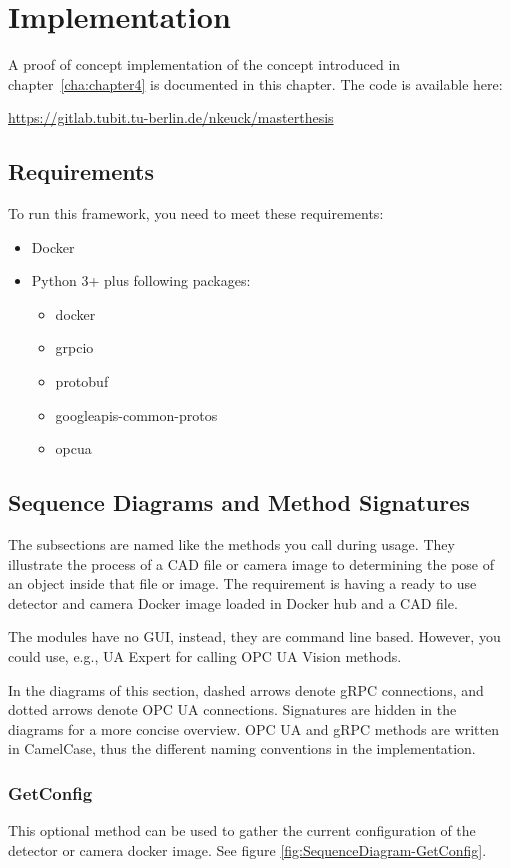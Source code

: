 \chapter{Implementation\label{cha:chapter5}}
A proof of concept implementation of the concept introduced in chapter~\ref{cha:chapter4} is documented in this chapter. The code is available here: 

\url{https://gitlab.tubit.tu-berlin.de/nkeuck/masterthesis}

\section{Requirements}
To run this framework, you need to meet these requirements:
\begin{itemize}
    \item Docker
    \item Python 3+ plus following packages:
    \begin{itemize}
        \item docker
        \item grpcio
        \item protobuf
        \item googleapis-common-protos
        \item opcua
    \end{itemize}
\end{itemize}

\section{Sequence Diagrams and Method Signatures}
The subsections are named like the methods you call during usage. They illustrate the process of a CAD file or camera image to determining the pose of an object inside that file or image. The requirement is having a ready to use detector and camera Docker image loaded in Docker hub and a CAD file. 

The modules have no GUI, instead, they are command line based. However, you could use, e.g., UA Expert for calling OPC UA Vision methods.

In the diagrams of this section, dashed arrows denote gRPC connections, and dotted arrows denote OPC UA connections. Signatures are hidden in the diagrams for a more concise overview. OPC UA and gRPC methods are written in CamelCase, thus the different naming conventions in the implementation.

\subsection{GetConfig}\label{subsec:getconfig}
This optional method can be used to gather the current configuration of the detector or camera docker image. See figure \ref{fig:SequenceDiagram-GetConfig}.

